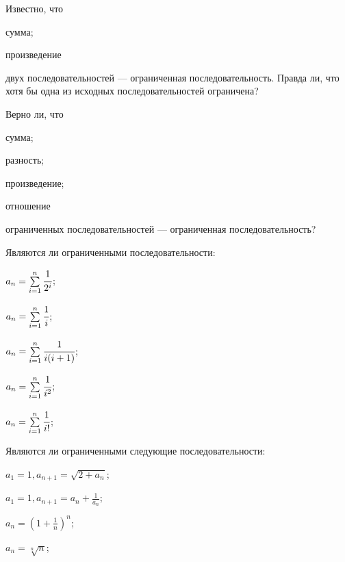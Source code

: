 \documentclass[a4paper, 12pt, num=24]{listok}
\begin{document}
\begin{problem}
    Известно, что
    \begin{probparts}
        \item сумма;
        \item произведение
    \end{probparts}
    двух последовательностей --- ограниченная последовательность.
    Правда ли, что хотя бы одна из исходных последовательностей ограничена?
\end{problem}
\begin{problem}
    Верно ли, что
    \begin{probparts}
        \item сумма;
        \item разность;
        \item произведение;
        \item отношение
    \end{probparts}
    ограниченных последовательностей --- ограниченная последовательность?
\end{problem}
\begin{problem}[$\mathghost$]
    Являются ли ограниченными последовательности:
    \begin{multienum}{3}
        \item $a_n = \sum\limits_{i = 1}^n \cfrac1{2^i}$;
        \item $a_n = \sum\limits_{i = 1}^n \cfrac1i$;
        \item $a_n = \sum\limits_{i = 1}^n \cfrac1{i(i + 1)}$;
        \item $a_n = \sum\limits_{i = 1}^n \cfrac1{i^2}$;
        \item $a_n = \sum\limits_{i = 1}^n \cfrac1{i!}$;
    \end{multienum}
\end{problem}
\begin{problem}[$\mathghost$]\label{exsecond}
    Являются ли ограниченными следующие последовательности:
    \begin{multienum}{3}
        \item $a_1 = 1, a_{n + 1} = \sqrt{2 + a_n}$;
        \item $a_1 = 1, a_{n + 1} = a_n + \frac1{a_n}$;
        \item $a_n = {(1 + \frac1n)}^n$;
        \item $a_n = \sqrt[n]n$;
    \end{multienum}
\end{problem}
\end{document}
